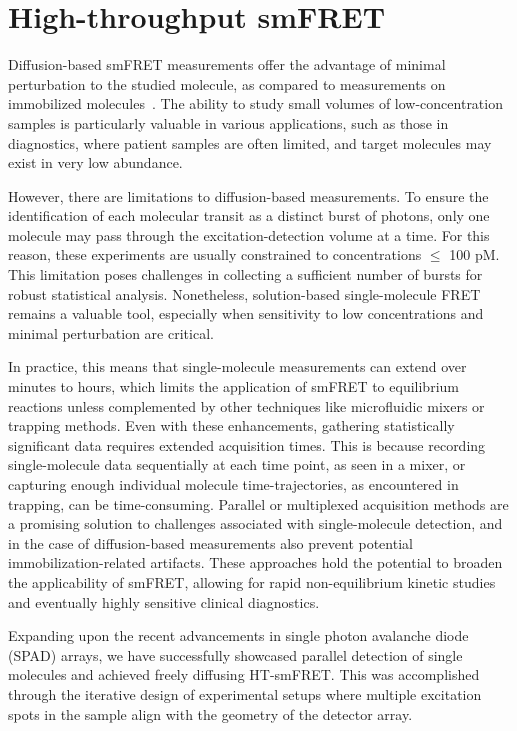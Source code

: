\chapter{High-throughput smFRET}
\label{chpt:ht-smFRET}

Diffusion-based \ac{smFRET} measurements offer the advantage of minimal perturbation to the studied molecule, as compared to measurements on immobilized molecules~\cite{rhoades_PNAS_2003,selvin_CSHLP_2008,cohen_OE_2008}.
The ability to study small volumes of low-concentration samples is particularly valuable in various applications, such as those in diagnostics, where patient samples are often limited, and target molecules may exist in very low abundance. 

However, there are limitations to diffusion-based measurements.
To ensure the identification of each molecular transit as a distinct burst of photons, only one molecule may pass through the excitation-detection volume at a time.
For this reason, these experiments are usually constrained to concentrations $\leq$ 100 pM.
This limitation poses challenges in collecting a sufficient number of bursts for robust statistical analysis. 
Nonetheless, solution-based single-molecule FRET remains a valuable tool, especially when sensitivity to low concentrations and minimal perturbation are critical.

In practice, this means that single-molecule measurements can extend over minutes to hours, which limits the application of \ac{smFRET} to equilibrium reactions unless complemented by other techniques like microfluidic mixers or trapping methods. 
Even with these enhancements, gathering statistically significant data requires extended acquisition times. 
This is because recording single-molecule data sequentially at each time point, as seen in a mixer, or capturing enough individual molecule time-trajectories, as encountered in trapping, can be time-consuming. 
Parallel or multiplexed acquisition methods are a promising solution to challenges associated with single-molecule detection,  and in the case of diffusion-based measurements also prevent potential immobilization-related artifacts.
These approaches hold the potential to broaden the applicability of \ac{smFRET}, allowing for rapid non-equilibrium kinetic studies and eventually highly sensitive clinical diagnostics.

Expanding upon the recent advancements in single photon avalanche diode (\ac{SPAD}) arrays, we have successfully showcased parallel detection of single molecules and achieved freely diffusing \ac{HT-smFRET}. 
This was accomplished through the iterative design of experimental setups where multiple excitation spots in the sample align with the geometry of the detector array. 

